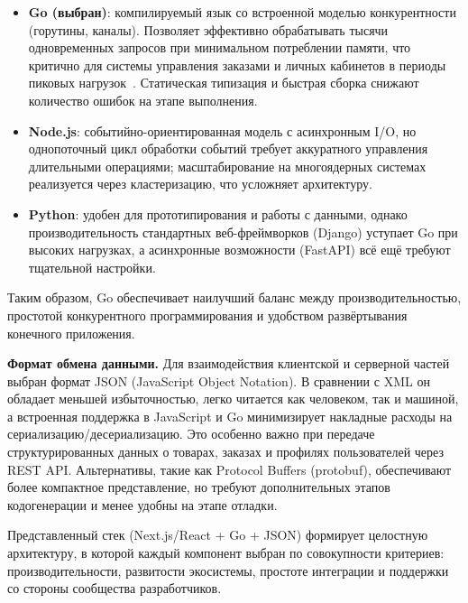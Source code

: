 \begin{itemize}
    \item \textbf{Go (выбран)}: компилируемый язык со встроенной моделью конкурентности (горутины, каналы). Позволяет эффективно обрабатывать тысячи одновременных запросов при минимальном потреблении памяти, что критично для системы управления заказами и личных кабинетов в периоды пиковых нагрузок~\cite{donovan2015go}. Статическая типизация и быстрая сборка снижают количество ошибок на этапе выполнения.
    \item \textbf{Node.js}: событийно-ориентированная модель с асинхронным I/O, но однопоточный цикл обработки событий требует аккуратного управления длительными операциями; масштабирование на многоядерных системах реализуется через кластеризацию, что усложняет архитектуру.
    \item \textbf{Python}: удобен для прототипирования и работы с данными, однако производительность стандартных веб-фреймворков (Django) уступает Go при высоких нагрузках, а асинхронные возможности (FastAPI) всё ещё требуют тщательной настройки.
\end{itemize}

Таким образом, Go обеспечивает наилучший баланс между производительностью, простотой конкурентного программирования и удобством развёртывания конечного приложения.

\textbf{Формат обмена данными.} Для взаимодействия клиентской и серверной частей выбран формат JSON (JavaScript Object Notation). В сравнении с XML он обладает меньшей избыточностью, легко читается как человеком, так и машиной, а встроенная поддержка в JavaScript и Go минимизирует накладные расходы на сериализацию/десериализацию. Это особенно важно при передаче структурированных данных о товарах, заказах и профилях пользователей через REST API. Альтернативы, такие как Protocol Buffers (protobuf), обеспечивают более компактное представление, но требуют дополнительных этапов кодогенерации и менее удобны на этапе отладки.

Представленный стек (Next.js/React + Go + JSON) формирует целостную архитектуру, в которой каждый компонент выбран по совокупности критериев: производительности, развитости экосистемы, простоте интеграции и поддержки со стороны сообщества разработчиков.
















